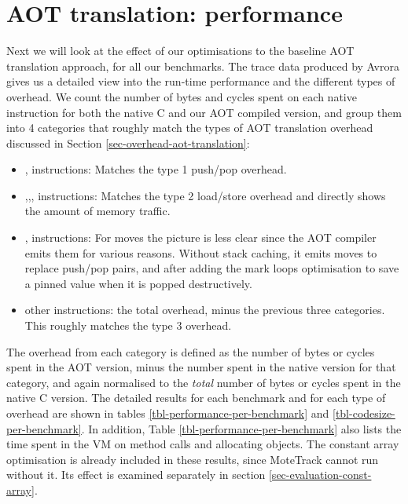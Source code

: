 


\section{AOT translation: performance}
\label{sec-evaluation-aot-translation-performance}

Next we will look at the effect of our optimisations to the baseline AOT translation approach, for all our benchmarks. The trace data produced by Avrora gives us a detailed view into the run-time performance and the different types of overhead. We count the number of bytes and cycles spent on each native instruction for both the native C and our AOT compiled version, and group them into 4 categories that roughly match the types of AOT translation overhead discussed in Section \ref{sec-overhead-aot-translation}:
\begin{itemize}
	\item {}, instructions: Matches the type 1 push/pop overhead.
	\item {},,, instructions: Matches the type 2 load/store overhead and directly shows the amount of memory traffic.
	\item {}, instructions: For moves the picture is less clear since the AOT compiler emits them for various reasons. Without stack caching, it emits moves to replace push/pop pairs, and after adding the mark loops optimisation to save a pinned value when it is popped destructively.
	\item other instructions: the total overhead, minus the previous three categories. This roughly matches the type 3 overhead.
\end{itemize}

The overhead from each category is defined as the number of bytes or cycles spent in the AOT version, minus the number spent in the native version for that category, and again normalised to the \emph{total} number of bytes or cycles spent in the native C version. The detailed results for each benchmark and for each type of overhead are shown in tables \ref{tbl-performance-per-benchmark} and \ref{tbl-codesize-per-benchmark}. In addition, Table \ref{tbl-performance-per-benchmark} also lists the time spent in the VM on method calls and allocating objects. The constant array optimisation is already included in these results, since MoteTrack cannot run without it. Its effect is examined separately in section \ref{sec-evaluation-const-array}.

